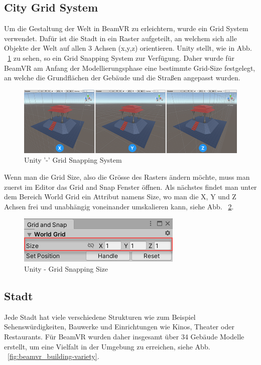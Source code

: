 \subsection{City Grid System}\label{subsec:city-grid-system}
Um die Gestaltung der Welt in BeamVR zu erleichtern, wurde ein Grid System verwendet.
Dafür ist die Stadt in ein Raster aufgeteilt, an welchem sich alle Objekte der Welt auf allen 3 Achsen (x,y,z) orientieren.
Unity stellt, wie in Abb. ~\ref{fig:grid-system-unity} zu sehen, so ein Grid Snapping System zur Verf\"ugung.
Daher wurde f\"ur BeamVR am Anfang der Modellierungsphase eine bestimmte Grid-Size festgelegt,
an welche die Grundfl\"achen der Geb\"aude und die Straßen
angepasst wurden.

\begin {figure}
    \centering
    \includegraphics[scale=0.5]{pics/unity-grid-snapping}
    \caption{Unity '-' Grid Snapping System}
    \label{fig:grid-system-unity}
\end {figure}

Wenn man die Grid Size, also die Gr\"osse des Rasters \"andern m\"ochte, muss man zuerst im Editor das Grid and Snap Fenster öffnen.
Als n\"achstes findet man unter dem Bereich World Grid ein Attribut namens Size, wo man die X, Y und Z Achsen frei und unabh\"angig voneinander umskalieren kann, siehe Abb. ~\ref{fig:grid-size-unity}.
~\cite{Unity_GridSnapping_2022}

\begin {figure}
    \centering
    \includegraphics{pics/unity-grid-snapping-size}
    \caption{Unity - Grid Snapping Size}
    \label{fig:grid-size-unity}
\end {figure}



\subsection{Stadt}\label{subsec:city}
Jede Stadt hat viele verschiedene Strukturen wie zum Beispiel Sehensw\"urdigkeiten, Bauwerke und Einrichtungen wie Kinos, Theater oder Restaurants.
F\"ur BeamVR wurden daher insgesamt \"uber 34 Geb\"aude Modelle erstellt, um eine Vielfalt in der Umgebung zu erreichen, siehe Abb. ~\ref{fig:beamvr_building-variety}.

